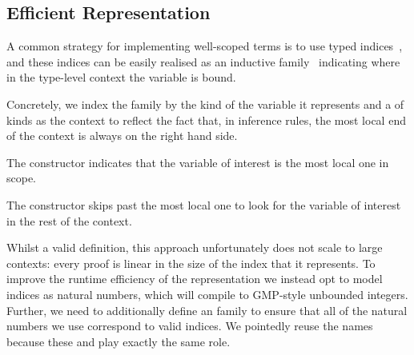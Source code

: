 \subsection{Efficient \DeBruijn{} Representation}
\label{sec:design:deBruijn}

A common strategy for implementing well-scoped terms is to use typed
\emph{\DeBruijn{}} indices~\cite{MANUAL:journals/math/debruijn72}, and these indices can be easily realised as an inductive family~\cite{DBLP:journals/fac/Dybjer94}
indicating where in the type-level context the variable is bound.

Concretely, we index the  family by the kind of the variable it represents and a  of kinds as the context to reflect the fact that,
in inference rules, the most local end of the context is always on the right hand side.

\begin{minipage}{0.10\textwidth}
\varRule
\end{minipage}\hfill
\begin{minipage}{0.80\textwidth}
\end{minipage}

The  constructor indicates that the variable of interest is
the most local one in scope.
%

\begin{minipage}{0.35\textwidth}
  \varZero
\end{minipage}\hfill
\begin{minipage}{0.55\textwidth}
\end{minipage}

The  constructor skips past the most local one to look for
the variable of interest in the rest of the context.

\begin{minipage}{0.35\textwidth}
  \varSuc
\end{minipage}\hfill
\begin{minipage}{0.55\textwidth}
\end{minipage}


Whilst a valid definition, this approach unfortunately does not scale to
large contexts:
%
every  proof is linear in the size of the \DeBruijn{}
index that it represents.
%
To improve the runtime efficiency of the representation we instead opt to
model \DeBruijn{} indices as natural numbers, which \Idris{} will compile to
GMP-style unbounded integers.
%
Further, we need to additionally define an  family to ensure that
all of the natural numbers we use correspond to valid indices.
%
We pointedly reuse the  names because these 
and  play exactly the same role.

